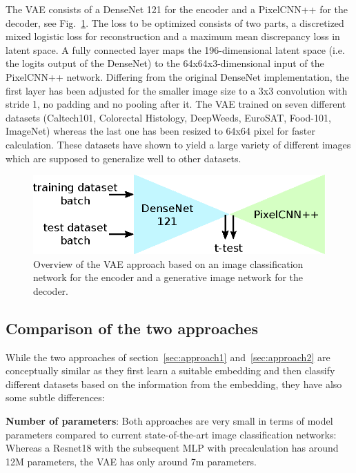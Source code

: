 \documentclass{article}
\begin{document}
The VAE consists of a DenseNet 121 \cite{huang17} for the encoder and a PixelCNN++ \cite{salimans17} for the decoder, see Fig.~\ref{fig:approach2}. The loss to be optimized consists of two parts, a discretized mixed logistic loss for reconstruction and a maximum mean discrepancy loss in latent space.  A fully connected layer maps the 196-dimensional latent space (i.e. the logits output of the DenseNet) to the 64x64x3-dimensional input of the PixelCNN++ network. Differing from the original DenseNet implementation, the first layer has been adjusted for the smaller image size to a 3x3 convolution with stride 1, no padding and no pooling after it. The VAE trained on seven different datasets (Caltech101, Colorectal Histology, DeepWeeds, EuroSAT, Food-101, ImageNet) whereas the last one has been resized to 64x64 pixel for faster calculation. These datasets have shown to yield a large variety of different images which are supposed to generalize well to other datasets.

%
\begin{figure}[htb]
\begin{center}
 	\includegraphics[width=0.8\linewidth]{../figures/approach2.eps} 
\end{center}
\caption{Overview of the VAE approach based on an image classification network for the encoder and a generative image network for the decoder.}
\label{fig:approach2}
\end{figure} 
% 


\subsection{Comparison of the two approaches}
\label{sec:comparison}

While the two approaches of section~\ref{sec:approach1} and~\ref{sec:approach2} are conceptually similar as they first learn a suitable embedding and then classify different datasets based on the information from the embedding, they have also some subtle differences:

\textbf{Number of parameters}: Both approaches are very small in terms of model parameters compared to current state-of-the-art image classification networks: Whereas a Resnet18 with the subsequent MLP with precalculation has around 12M parameters, the VAE has only around 7m parameters.
\end{document}
